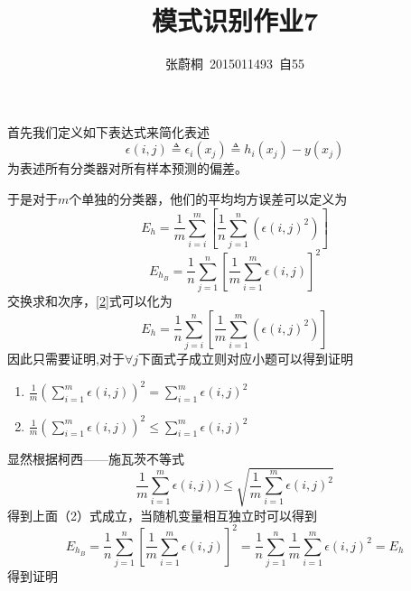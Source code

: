 \documentclass[UTF8,a4paper]{paper}
\title{模式识别作业7}
\author{张蔚桐\ 2015011493\ 自55}
\begin{document}
\maketitle
\section{}
\subsection{}
首先我们定义如下表达式来简化表述
\begin{equation}
\epsilon(i,j)\triangleq\epsilon_i(x_j)\triangleq h_i(x_j)-y(x_j)
\label{1}
\end{equation}
为表述所有分类器对所有样本预测的偏差。

于是对于$m$个单独的分类器，他们的平均均方误差可以定义为
\begin{equation}
E_h=\frac{1}{m}\sum_{i=i}^m[\frac{1}{n}\sum_{j=1}^n(\epsilon(i,j)^2)]
\label{2}
\end{equation}
\begin{equation}
E_{h_B}=\frac{1}{n}\sum_{j=1}^n[\frac{1}{m}\sum_{i=1}^{m}\epsilon(i,j)]^2
\label{3}
\end{equation}
交换求和次序，\ref{2}式可以化为
\begin{equation}
E_h=\frac{1}{n}\sum_{j=i}^n[\frac{1}{m}\sum_{i=1}^m(\epsilon(i,j)^2)]
\label{3}
\end{equation}
因此只需要证明,对于$\forall j $下面式子成立则对应小题可以得到证明
\begin{enumerate}
\item $\displaystyle{\frac{1}{m}(\sum_{i=1}^m\epsilon(i,j))^2 =  \sum_{i=1}^m\epsilon(i,j)^2}$
\item $\displaystyle{\frac{1}{m}(\sum_{i=1}^m\epsilon(i,j))^2 \le  \sum_{i=1}^m\epsilon(i,j)^2}$
\end{enumerate}
显然根据柯西——施瓦茨不等式
\begin{equation}
\frac{1}{m}\sum_{i=1}^m\epsilon(i,j)) \le \sqrt{\frac{1}{m}  \sum_{i=1}^m\epsilon(i,j)^2}
\end{equation}
得到上面（2）式成立，当随机变量相互独立时可以得到
\begin{equation}
E_{h_B}=\frac{1}{n}\sum_{j=1}^n[\frac{1}{m}\sum_{i=1}^{m}\epsilon(i,j)]^2=\frac{1}{n}\sum_{j=1}^n\frac{1}{m}\sum_{i=1}^{m}\epsilon(i,j)^2=E_h
\end{equation}
得到证明
\section{}
\end{document}
